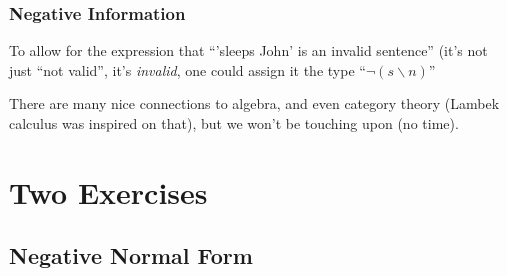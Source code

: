 \documentclass{beamer}
\begin{document}
\begin{frame}
  \frametitle{Negative Information}
  To allow for the expression that ``'sleeps John' is an invalid
  sentence'' (it's not just ``not valid'', it's \textit{invalid}, one could assign it the type ``$¬(s\backslash n)$''
  
  There are many nice connections to algebra, and even category theory (Lambek calculus was inspired on that), but we won't be touching upon (no time).
  
\end{frame}
  

\section{Two Exercises}
\subsection{Negative Normal Form}
\end{document}
